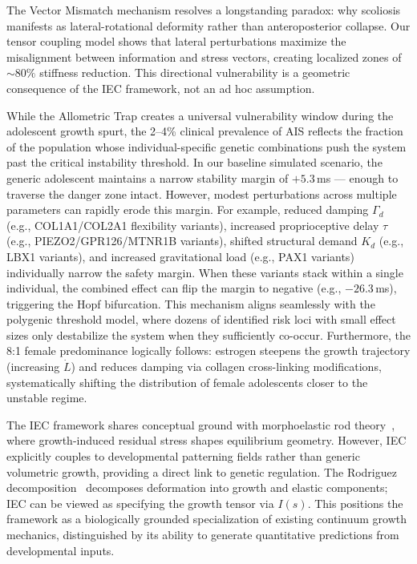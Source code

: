 \documentclass[11pt]{article}
\begin{document}
The Vector Mismatch mechanism resolves a longstanding paradox: why scoliosis manifests as lateral-rotational deformity rather than anteroposterior collapse. Our tensor coupling model shows that lateral perturbations maximize the misalignment between information and stress vectors, creating localized zones of ${\sim}80\%$ stiffness reduction. This directional vulnerability is a geometric consequence of the IEC framework, not an ad hoc assumption.

While the Allometric Trap creates a universal vulnerability window during the adolescent growth spurt, the 2--4\% clinical prevalence of AIS reflects the fraction of the population whose individual-specific genetic combinations push the system past the critical instability threshold. In our baseline simulated scenario, the generic adolescent maintains a narrow stability margin of $+5.3$\,ms --- enough to traverse the danger zone intact. However, modest perturbations across multiple parameters can rapidly erode this margin. For example, reduced damping $\Gamma_d$ (e.g., COL1A1/COL2A1 flexibility variants), increased proprioceptive delay $\tau$ (e.g., PIEZO2/GPR126/MTNR1B variants), shifted structural demand $K_d$ (e.g., LBX1 variants), and increased gravitational load (e.g., PAX1 variants) individually narrow the safety margin. When these variants stack within a single individual, the combined effect can flip the margin to negative (e.g., $-26.3$\,ms), triggering the Hopf bifurcation. This mechanism aligns seamlessly with the polygenic threshold model, where dozens of identified risk loci with small effect sizes only destabilize the system when they sufficiently co-occur. Furthermore, the 8:1 female predominance logically follows: estrogen steepens the growth trajectory (increasing $\dot{L}$) and reduces damping via collagen cross-linking modifications, systematically shifting the distribution of female adolescents closer to the unstable regime.

The IEC framework shares conceptual ground with morphoelastic rod theory~\cite{moulton2013morphoelastic}, where growth-induced residual stress shapes equilibrium geometry. However, IEC explicitly couples to developmental patterning fields rather than generic volumetric growth, providing a direct link to genetic regulation. The Rodriguez decomposition~\cite{rodriguez1994stress} decomposes deformation into growth and elastic components; IEC can be viewed as specifying the growth tensor via $I(s)$. This positions the framework as a biologically grounded specialization of existing continuum growth mechanics, distinguished by its ability to generate quantitative predictions from developmental inputs.
\end{document}
